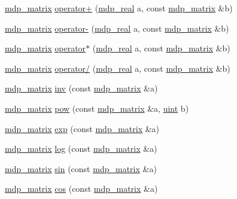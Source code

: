 \begin{DoxyCompactItemize}
\item 
\hyperlink{classmdp__matrix}{mdp\+\_\+matrix} \hyperlink{classmdp__matrix_ace32cb8f1638c0ff6917045e2d10f467}{operator+} (\hyperlink{mdp__global__vars_8h_a69d96b74c791e0bbdb888b3913a69450}{mdp\+\_\+real} a, const \hyperlink{classmdp__matrix}{mdp\+\_\+matrix} \&b)
\item 
\hyperlink{classmdp__matrix}{mdp\+\_\+matrix} \hyperlink{classmdp__matrix_a0034bcdf68e3b07c30b406e046401937}{operator-\/} (\hyperlink{mdp__global__vars_8h_a69d96b74c791e0bbdb888b3913a69450}{mdp\+\_\+real} a, const \hyperlink{classmdp__matrix}{mdp\+\_\+matrix} \&b)
\item 
\hyperlink{classmdp__matrix}{mdp\+\_\+matrix} \hyperlink{classmdp__matrix_a0518710232891fb4bded31598cc6cd5e}{operator$\ast$} (\hyperlink{mdp__global__vars_8h_a69d96b74c791e0bbdb888b3913a69450}{mdp\+\_\+real} a, const \hyperlink{classmdp__matrix}{mdp\+\_\+matrix} \&b)
\item 
\hyperlink{classmdp__matrix}{mdp\+\_\+matrix} \hyperlink{classmdp__matrix_a78e9bd78d0aa894b75fa5e92e195d327}{operator/} (\hyperlink{mdp__global__vars_8h_a69d96b74c791e0bbdb888b3913a69450}{mdp\+\_\+real} a, const \hyperlink{classmdp__matrix}{mdp\+\_\+matrix} \&b)
\item 
\hyperlink{classmdp__matrix}{mdp\+\_\+matrix} \hyperlink{classmdp__matrix_a01d58a336c980c060907abb7141eedee}{inv} (const \hyperlink{classmdp__matrix}{mdp\+\_\+matrix} \&a)
\item 
\hyperlink{classmdp__matrix}{mdp\+\_\+matrix} \hyperlink{classmdp__matrix_aed471057fee36406313f0d6db8469981}{pow} (const \hyperlink{classmdp__matrix}{mdp\+\_\+matrix} \&a, \hyperlink{mdp__global__vars_8h_a91ad9478d81a7aaf2593e8d9c3d06a14}{uint} b)
\item 
\hyperlink{classmdp__matrix}{mdp\+\_\+matrix} \hyperlink{classmdp__matrix_af3a316cad42444877d4ab7e2a72c37c7}{exp} (const \hyperlink{classmdp__matrix}{mdp\+\_\+matrix} \&a)
\item 
\hyperlink{classmdp__matrix}{mdp\+\_\+matrix} \hyperlink{classmdp__matrix_a173074a62f14de569920183069485652}{log} (const \hyperlink{classmdp__matrix}{mdp\+\_\+matrix} \&a)
\item 
\hyperlink{classmdp__matrix}{mdp\+\_\+matrix} \hyperlink{classmdp__matrix_ae7a9b12e9cedc3d6f274c9fe9eb44332}{sin} (const \hyperlink{classmdp__matrix}{mdp\+\_\+matrix} \&a)
\item 
\hyperlink{classmdp__matrix}{mdp\+\_\+matrix} \hyperlink{classmdp__matrix_aba32e6f9246f9ebad76f6b5c4e696cea}{cos} (const \hyperlink{classmdp__matrix}{mdp\+\_\+matrix} \&a)

\end{DoxyCompactItemize}
